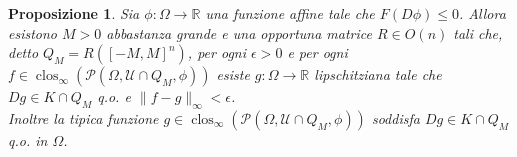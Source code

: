 \documentclass[a4paper,11pt]{book}
\theoremstyle{plain}
\newtheorem{prop}[teo]{Proposizione}
\theoremstyle{definition}
\theoremstyle{remark}
\newcommand{\R}{\mathbb{R}}
\newcommand{\M}{\mathbb{M}}
\newcommand{\norm}[1]{\lVert#1\rVert}
\DeclareMathOperator{\rk}{rk}
\DeclareMathOperator{\dist}{dist}
\DeclareMathOperator{\clos}{clos}
\begin{document}
\begin{comment}
	Definiamo quindi $\hat{\mathcal{U}}=[-M,M]^{n}\cap\mathcal{U}$ e $\hat{K}=[-M,M]^{n}\cap K$, per poter applicare la Proposizione \ref{prop:3} ci basta mostrare che i gradienti in $\hat{\mathcal{U}}$ sono stabili solo vicino a $\hat{K}$, ma questo è molto semplice grazie alle costruzioni che abbiamo già: se $A\in\hat{\mathcal{U}}$ è tale che $\dist(A,\hat{K})>\epsilon$ allora necessariamente $A\in\mathring{\mathcal{U}}\cap[-M,M]^{n}$, ma poiché $mM-q>0$ allora esiste un segmento $J=[B,C]\subset \hat{\mathcal{U}}$ di lunghezza $|B-C|=\epsilon$ con centro $A$. Dato che $\hat{\mathcal{U}}\subset\M^{1\times n}$ allora necessariamente $\rk(B-C)=1$, quindi grazie al Lemma \ref{lemma:5} troviamo una funzione $\phi$ adatta (prendendo come dominio un piccolo aperto), come richiesto dalla definizione di stabilità.
		
	Possiamo finalmente applicare la Proposizione \ref{prop:3} agli insiemi $\hat{\mathcal{U}}$ e $\hat{K}$, in questo modo otteniamo che la tipica funzione $h$ in $\clos_{\infty}(\mathscr{P}(\Omega,\hat{\mathcal{U}},\phi))$ soddisfa $Dh\in\hat{K}$ q.o. in $\Omega$. Quindi come funzione $g$ basta prendere una funzione tipica in $\clos_{\infty}(\mathscr{P}(\Omega,\hat{\mathcal{U}},\phi))$ che sia abbastanza vicina ad $f$ in norma $\norm{\cdot}_{\infty}$.
\end{proof}
\end{comment}
\begin{prop}
	Sia $\phi:\Omega\to\R$ una funzione affine tale che $F(D\phi)\leq 0$. Allora esistono $M>0$ abbastanza grande e una opportuna matrice $R\in O(n)$ tali che, detto $Q_{M} = R([-M,M]^{n})$, per ogni $\epsilon>0$ e per ogni $f\in\clos_{\infty}(\mathscr{P}(\Omega,\mathcal{U}\cap Q_{M},\phi))$ esiste $g:\Omega\to\R$ lipschitziana tale che $Dg\in K\cap Q_{M}$ q.o. e $\norm{f-g}_{\infty}<\epsilon$.\\
	Inoltre la tipica funzione $g\in\clos_{\infty}(\mathscr{P}(\Omega,\mathcal{U}\cap Q_{M},\phi))$ soddisfa $Dg\in K\cap Q_{M}$ q.o. in $\Omega$.
\end{prop}
\end{document}
